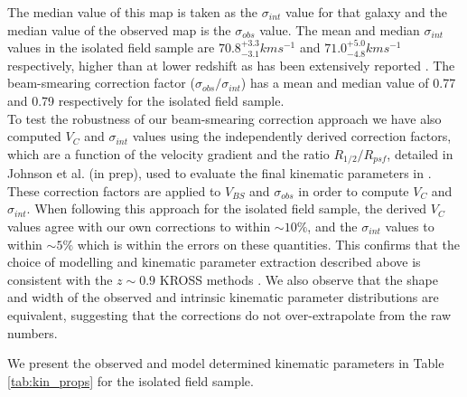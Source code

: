 \documentclass[fleqn,usenatbib]{mn2e}
\begin{document}
The median value of this map is taken as the $\sigma_{int}$ value for that galaxy and the median value of the observed map is the $\sigma_{obs}$ value.
The mean and median $\sigma_{int}$ values in the isolated field sample are $70.8^{+3.3}_{-3.1} kms^{-1}$ and $71.0^{+5.0}_{-4.8} kms^{-1}$ respectively, higher than at lower redshift as has been extensively reported \citep[e.g.][]{Genzel2006,Genzel2008,ForsterSchreiber2009,Law2009,Gnerucci2011,Epinat2012,Wisnioski2015}.
The beam-smearing correction factor ($\sigma_{obs}/\sigma_{int}$) has a mean and median value of 0.77 and 0.79 respectively for the isolated field sample. \\

To test the robustness of our beam-smearing correction approach we have also computed $V_{C}$ and $\sigma_{int}$ values using the independently derived correction factors, which are a function of the velocity gradient and the ratio $R_{1/2}/R_{psf}$, detailed in Johnson et al. (in prep), used to evaluate the final kinematic parameters in \cite{Harrison2017}.
These correction factors are applied to $V_{BS}$ and $\sigma_{obs}$ in order to compute $V_{C}$ and $\sigma_{int}$.
When following this approach for the isolated field sample, the derived $V_{C}$ values agree with our own corrections to within $\sim10\%$, and the $\sigma_{int}$ values to within $\sim5\%$ which is within the errors on these quantities. 
This confirms that the choice of modelling and kinematic parameter extraction described above is consistent with the $z\sim0.9$ KROSS methods \citep{Harrison2017}.
We also observe that the shape and width of the observed and intrinsic kinematic parameter distributions are equivalent, suggesting that the corrections do not over-extrapolate from the raw numbers.

We present the observed and model determined kinematic parameters in Table \ref{tab:kin_props} for the isolated field sample.
\end{document}
